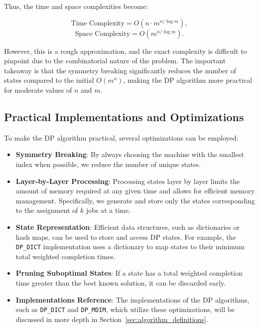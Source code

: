 Thus, the time and space complexities become:

\[
    \text{Time Complexity} = O\left( n \cdot m^{ n / \log m } \right),
\]
\[
    \text{Space Complexity} = O\left( m^{ n /\log m } \right).
\]

However, this is a rough approximation, and the exact complexity is difficult to pinpoint due to the combinatorial nature of the problem. The important takeaway is that the symmetry breaking significantly reduces the number of states compared to the initial $O(m^n)$, making the DP algorithm more practical for moderate values of $n$ and $m$.

\subsection{Practical Implementations and Optimizations}

To make the DP algorithm practical, several optimizations can be employed:

\begin{itemize}
    \item \textbf{Symmetry Breaking}: By always choosing the machine with the smallest index when possible, we reduce the number of unique states.

    \item \textbf{Layer-by-Layer Processing}: Processing states layer by layer limits the amount of memory required at any given time and allows for efficient memory management. Specifically, we generate and store only the states corresponding to the assignment of $k$ jobs at a time.

    \item \textbf{State Representation}: Efficient data structures, such as dictionaries or hash maps, can be used to store and access DP states. For example, the \texttt{DP\_DICT} implementation uses a dictionary to map states to their minimum total weighted completion times.

    \item \textbf{Pruning Suboptimal States}: If a state has a total weighted completion time greater than the best known solution, it can be discarded early.

    \item \textbf{Implementations Reference}: The implementations of the DP algorithms, such as \texttt{DP\_DICT} and \texttt{DP\_MDIM}, which utilize these optimizations, will be discussed in more depth in Section~\ref{sec:algorithm_definitions}.
\end{itemize}

